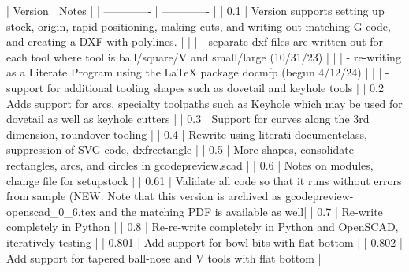 \documentclass{ltxdoc}
\begin{document}
\begin{readme}
| Version       | Notes         |
| ------------- | ------------- |
| 0.1           | Version  supports setting up stock, origin, rapid positioning, making cuts, and writing out matching G-code, and creating a DXF with polylines.                                 |
|               |  - separate dxf files are written out for each tool where tool is ball/square/V and small/large (10/31/23)                                                                      |
|               |  - re-writing as a Literate Program using the LaTeX package docmfp (begun 4/12/24)                                                                                              |
|               |  - support for additional tooling shapes such as dovetail and keyhole tools                                                                                                     |
| 0.2           | Adds support for arcs, specialty toolpaths such as Keyhole which may be used for dovetail as well as keyhole cutters                                                            |
| 0.3           | Support for curves along the 3rd dimension, roundover tooling                                                                                                                   |
| 0.4           | Rewrite using literati documentclass, suppression of SVG code, dxfrectangle                                                                                                     |
| 0.5           | More shapes, consolidate rectangles, arcs, and circles in gcodepreview.scad                                                                                                     |
| 0.6           | Notes on modules, change file for setupstock                                                                                                                                    |
| 0.61          | Validate all code so that it runs without errors from sample (NEW: Note that this version is archived as gcodepreview-openscad_0_6.tex and the matching PDF is available as well|
| 0.7           | Re-write completely in Python                                                                                                                                                   |
| 0.8           | Re-re-write completely in Python and OpenSCAD, iteratively testing                                                                                                              |
| 0.801         | Add support for bowl bits with flat bottom                                                                                                                                      |
| 0.802         | Add support for tapered ball-nose and  V tools with flat bottom                                                                                                                 |


\end{readme}
\end{document}
